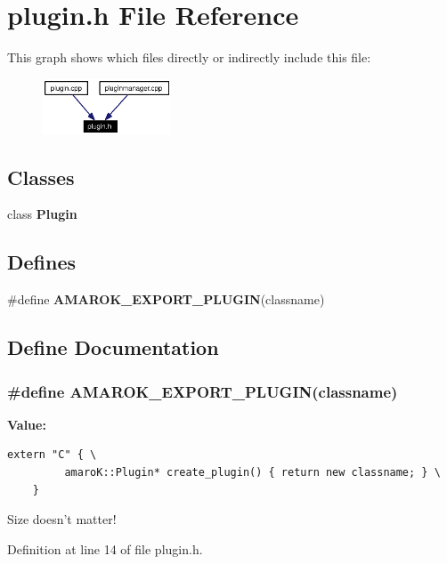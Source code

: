 \section{plugin.h File Reference}
\label{plugin_8h}




This graph shows which files directly or indirectly include this file:\begin{figure}[H]
\begin{center}
\leavevmode
\includegraphics[width=108pt]{plugin_8h__dep__incl}
\end{center}
\end{figure}
\subsection*{Classes}
\begin{CompactItemize}
\item 
class {\bf Plugin}
\end{CompactItemize}
\subsection*{Defines}
\begin{CompactItemize}
\item 
\#define {\bf AMAROK\_\-EXPORT\_\-PLUGIN}(classname)
\end{CompactItemize}


\subsection{Define Documentation}
\subsubsection{\setlength{\rightskip}{0pt plus 5cm}\#define AMAROK\_\-EXPORT\_\-PLUGIN(classname)}\label{plugin_8h_a0}


{\bf Value:}

\footnotesize\begin{verbatim}extern "C" { \
         amaroK::Plugin* create_plugin() { return new classname; } \
    }
\end{verbatim}\normalsize 
Size doesn't matter! 

Definition at line 14 of file plugin.h.
